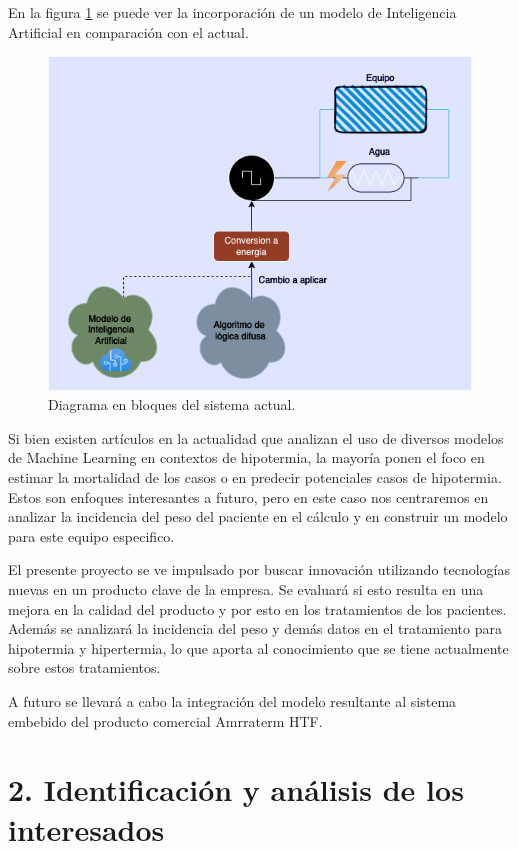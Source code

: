 \documentclass[
11pt, %
]{charter}
\begin{document}
En la figura  \ref{fig:diagBloquesFuturo} se puede ver la incorporación de un modelo de Inteligencia Artificial en comparación con el actual.

\begin{figure}[htpb]
	\centering 
	\includegraphics[width=.65\textwidth]{./Figuras/amrra-diagrama2.png}
	\caption{Diagrama en bloques del sistema actual.}
	\label{fig:diagBloquesFuturo}
\end{figure}

Si bien existen artículos en la actualidad que analizan el uso de diversos modelos de Machine Learning en contextos de hipotermia, la mayoría ponen el foco en estimar la mortalidad de los casos o en predecir potenciales casos de hipotermia. Estos son enfoques interesantes a futuro, pero en este caso nos centraremos en analizar la incidencia del peso del paciente en el cálculo y en construir un modelo para este equipo especifico. 

El presente proyecto se ve impulsado por buscar innovación utilizando tecnologías nuevas en un producto clave de la empresa. Se evaluará si esto resulta en una mejora en la calidad del producto y por esto en los tratamientos de los pacientes. Además se analizará la incidencia del peso y demás datos en el tratamiento para hipotermia y hipertermia, lo que aporta al conocimiento que se tiene actualmente sobre estos tratamientos. 

A futuro se llevará a cabo la integración del modelo resultante al sistema embebido del producto comercial Amrraterm HTF.

\section{2. Identificación y análisis de los interesados}
\label{sec:interesados}
\end{document}
